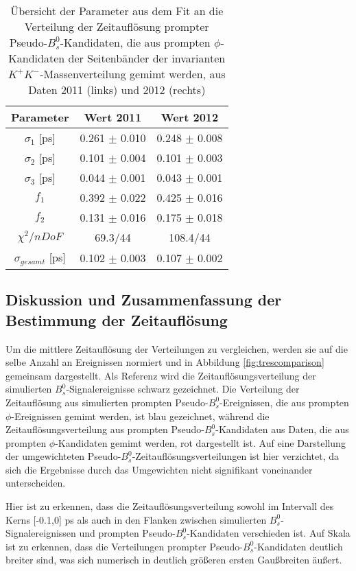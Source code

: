 \documentclass{article}
\begin{document}
\begin{table}[h!]
\noindent \begin{centering}
\begin{tabular}{c|c|c}
Parameter&Wert 2011&Wert 2012\tabularnewline
\hline 
$\sigma_1$ [ps] & 0.261 $\pm$ 0.010 & 0.248 $\pm$ 0.008 \tabularnewline
$\sigma_2$ [ps]& 0.101 $\pm$ 0.004  & 0.101 $\pm$ 0.003 \tabularnewline
$\sigma_3$ [ps]& 0.044 $\pm$ 0.001 & 0.043 $\pm$ 0.001 \tabularnewline%
$f_1$ & 0.392 $\pm$ 0.022 & 0.425 $\pm$ 0.016   \tabularnewline
$f_2$ & 0.131 $\pm$ 0.016 & 0.175 $\pm$ 0.018 \tabularnewline
\hline
$\chi^2/nDoF$ & 69.3/44 & 108.4/44\tabularnewline
\hline
$\sigma_{gesamt}$ [ps]&0.102 $\pm$ 0.003&0.107 $\pm$ 0.002 \tabularnewline
\end{tabular}
\par \end{centering}
\caption{Übersicht der Parameter aus dem Fit an die Verteilung der Zeitauflösung prompter Pseudo-$B_s^0$-Kandidaten, die aus prompten $\phi$-Kandidaten der Seitenbänder der invarianten $K^+K^-$-Massenverteilung gemimt werden, aus Daten 2011 (links) und 2012 (rechts)}
\label{table:seite}
\end{table}

\subsection{Diskussion und Zusammenfassung der Bestimmung der Zeitauflösung}
Um die mittlere Zeitauflösung der Verteilungen zu vergleichen, werden sie auf die selbe Anzahl an Ereignissen normiert und in Abbildung \ref{fig:trescomparison} gemeinsam dargestellt. Als Referenz wird die Zeitauflösungsverteilung der simulierten $B_s^0$-Signalereignisse schwarz gezeichnet. Die Verteilung der Zeitauflösung aus simulierten prompten Pseudo-$B_s^0$-Ereignissen, die aus prompten $\phi$-Ereignissen gemimt werden, ist blau gezeichnet, während die Zeitauflösungsverteilung aus prompten Pseudo-$B_s^0$-Kandidaten aus Daten, die aus prompten $\phi$-Kandidaten gemimt werden, rot dargestellt ist. Auf eine Darstellung der umgewichteten Pseudo-$B_s^0$-Zeitauflösungsverteilungen ist hier verzichtet, da sich die Ergebnisse durch das Umgewichten nicht signifikant voneinander unterscheiden. 

Hier ist zu erkennen, dass die Zeitauflösungsverteilung sowohl im Intervall des Kerns [-0.1,0] ps als auch in den Flanken zwischen simulierten $B_s^0$-Signalereignissen und prompten Pseudo-$B_s^0$-Kandidaten verschieden ist. Auf  Skala ist zu erkennen, dass die Verteilungen prompter Pseudo-$B_s^0$-Kandidaten deutlich breiter sind, was sich numerisch in deutlich größeren ersten Gaußbreiten äußert.
\end{document}
